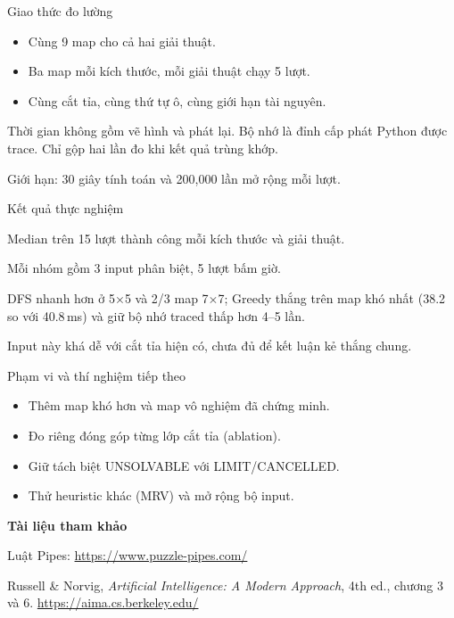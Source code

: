 \begin{frame}{Giao thức đo lường}
\begin{itemize}
\item Cùng 9 map cho cả hai giải thuật.
\item Ba map mỗi kích thước, mỗi giải thuật chạy 5 lượt.
\item Cùng cắt tỉa, cùng thứ tự ô, cùng giới hạn tài nguyên.
\end{itemize}
\vspace{4mm}
\vspace{4mm}\par
\small Thời gian không gồm vẽ hình và phát lại. Bộ nhớ là đỉnh cấp phát
Python được trace. Chỉ gộp hai lần đo khi kết quả trùng khớp.\par\vspace{3mm}
Giới hạn: 30 giây tính toán và 200{,}000 lần mở rộng mỗi lượt.
\end{frame}

\begin{frame}{Kết quả thực nghiệm}

\vspace{3mm}
\small Median trên 15 lượt thành công mỗi kích thước và giải thuật.\par
Mỗi nhóm gồm 3 input phân biệt, 5 lượt bấm giờ.\par\vspace{3mm}
DFS nhanh hơn ở 5$\times$5 và 2/3 map 7$\times$7; Greedy thắng trên map khó nhất
(38.2 so với 40.8\,ms) và giữ bộ nhớ traced thấp hơn 4--5 lần.\par
Input này khá dễ với cắt tỉa hiện có, chưa đủ để kết luận kẻ thắng chung.
\end{frame}

\begin{frame}{Phạm vi và thí nghiệm tiếp theo}
\begin{itemize}
\item Thêm map khó hơn và map vô nghiệm đã chứng minh.
\item Đo riêng đóng góp từng lớp cắt tỉa (ablation).
\item Giữ tách biệt UNSOLVABLE với LIMIT/CANCELLED.
\item Thử heuristic khác (MRV) và mở rộng bộ input.
\end{itemize}
\vspace{5mm}
\small\textbf{Tài liệu tham khảo}\par\vspace{2mm}
Luật Pipes: \url{https://www.puzzle-pipes.com/}\par
Russell \& Norvig, \emph{Artificial Intelligence: A Modern Approach},
4th ed., chương 3 và 6. \url{https://aima.cs.berkeley.edu/}
\end{frame}
